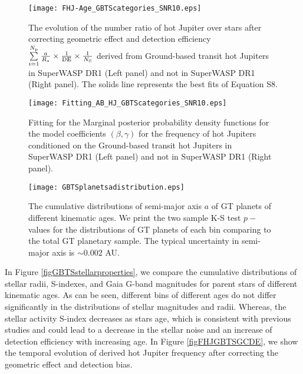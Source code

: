 \documentclass[twocolumn]{pnas-new}
\begin{document}
\begin{figure}[!t]
\centering
\texttt{[image: FHJ-Age\_GBTScategories\_SNR10.eps]}
\caption{The evolution of the number ratio of hot Jupiter over stars after correcting geometric effect and detection efficiency $\sum\limits_{i=1}^{N_{\rm p}}{\frac{a}{R_*} \times \frac{1}{\rm DE}} \times \frac{1}{N_{\rm S}}$ derived from Ground-based transit hot Jupiters in SuperWASP DR1 (Left panel) and not in SuperWASP DR1 (Right panel).
The solids line represents the best fits of Equation S8.
\label{figFHJGBTScategory}}
\end{figure}


\begin{figure}[!t]
\centering
\texttt{[image: Fitting\_AB\_HJ\_GBTScategories\_SNR10.eps]}
\caption{Fitting for the Marginal posterior probability density functions for the model coefficients $(\beta, \gamma)$ for the frequency of hot Jupiters conditioned on the Ground-based transit hot Jupiters in SuperWASP DR1 (Left panel) and not in SuperWASP DR1 (Right panel).
\label{figFHJfittingGBTScategories}}
\end{figure}

\begin{figure}[!t]
\centering
\texttt{[image: GBTSplanetsadistribution.eps]}
\caption{The cumulative distributions of semi-major axis $a$ of GT planets of different kinematic ages. We print the two sample K-S test $p-$values for the distributions of GT planets of each bin comparing to the total GT planetary sample.
{The typical uncertainty in semi-major axis is $\sim 0.002$ AU.}
\label{figGBTSadis}}
\end{figure}

In Figure \ref{figGBTSstellarproperties}, we compare the cumulative distributions of stellar radii, S-indexes, and Gaia G-band magnitudes for parent stars of different kinematic ages.
As can be seen, different bins of different ages do not differ significantly in the distributions of stellar magnitudes and radii.
Whereas, the stellar activity S-index decreases as stars age, which is consistent with previous studies \citep{2021AJ....162..100C} and could lead to a decrease in the stellar noise \citep{2011ApJS..197....6G,2021AJ....162..100C} and an increase of detection efficiency with increasing age.
In Figure \ref{figFHJGBTSGCDE}, we show the temporal evolution of derived hot Jupiter frequency after correcting the geometric effect and detection bias.
\end{document}
